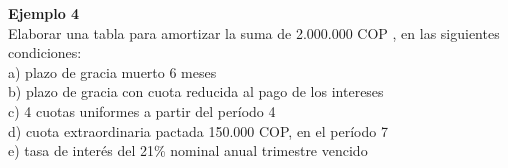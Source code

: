 \textbf{Ejemplo 4}\\
Elaborar una tabla para amortizar la suma de  2.000.000 COP , en las siguientes condiciones:\\
a)	plazo de gracia muerto 6 meses\\
b)	plazo de gracia con cuota reducida al pago de los intereses \\
c)	4 cuotas uniformes a partir del período 4\\
d)	cuota extraordinaria pactada  150.000 COP, en el período 7\\
e)	tasa de interés del 21\% nominal anual trimestre vencido\\




